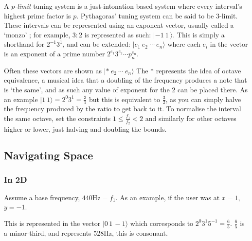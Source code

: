 A \emph{$p$-limit} tuning system is a just-intonation based system where every
interval's highest prime factor is $p$. \citep[p.76, 109]{partch1974genesis}
Pythagoras' tuning system can be said to be 3-limit. These intervals can be
represented using an exponent vector, usually called a `monzo'
\citep{monzo_2005}; for example, $3:2$ is represented as such: $|-1\ 1\ \rangle$.
This is simply a shorthand for $2^{-1} 3^1$, and can be extended: $|e_1\ e_2\
\cdots\ e_n\rangle$ where each $e_i$ in the vector is an exponent of a prime
number $2^{e_1} 3^{e_2} \cdots p_n^{e_n}$. 

Often these vectors are shown as $|*\ e_2\ \cdots\ e_n \rangle$ The $*$ represents the idea
of octave equivalence, a musical idea that a doubling of the frequency produces
a note that is `the same', and as such any value of exponent for the $2$ can be
placed there. As an example $|1\ 1\rangle = 2^0 3^1 = \frac{3}{1}$ but this is
equivalent to $\frac{3}{2}$, as you can simply halve the frequency produced by
the ratio to get back to it. To normalise the interval the same octave, set the
constraints $1 \leq \frac{f_1}{f_2} < 2$ and similarly for other octaves higher
or lower, just halving and doubling the bounds.

\subsection{Navigating Space}
\subsubsection{In 2D}
Assume a base frequency, $440\si{\hertz} = f_1$. As an example, if the user was
at $x=1$, $y=-1$.

\begin{figure}[H]
    \centering
    \caption{}
\end{figure}

This is represented in the vector $|0\, 1\, -1\rangle$ which corresponds to $2^0
3^1 5^{-1} = \frac{6}{5}$. $\frac{6}{5}$ is a minor-third, and represents
$528\si{\hertz}$, this is consonant.

